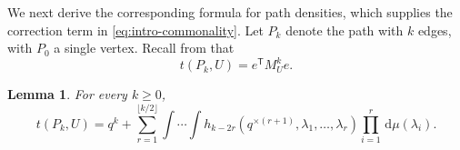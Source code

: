 \documentclass[11pt]{article}
\newtheorem{lemma}[theorem]{Lemma}
\theoremstyle{remark}
\numberwithin{equation}{section}
\newcommand{\dd}{\,\mathrm d}
\newcommand{\tP}[2]{t(P_{#1},#2)}
\newcommand{\rep}[2]{#1^{\times #2}}
\begin{document}
We next derive the corresponding formula for path densities, which supplies the correction term in \eqref{eq:intro-commonality}.
Let $P_k$ denote the path with $k$ edges, with $P_0$ a single vertex.
Recall from  that
\begin{equation*}
  \tP kU=e^{\mathsf T}M_U^ke.
\end{equation*}

\begin{lemma}
\label{lem:path-excursions}
  For every $k\ge0$,
  \begin{equation}\label{eq:path-expansion}
    \tP kU=q^k+
    \sum_{r=1}^{\lfloor k/2\rfloor}
      \int\!\cdots\!\int
      h_{k-2r}(\rep q{(r+1)},\lambda_1,\ldots,\lambda_r)
      \prod_{i=1}^r\dd\mu(\lambda_i).
  \end{equation}
\end{lemma}
\end{document}
